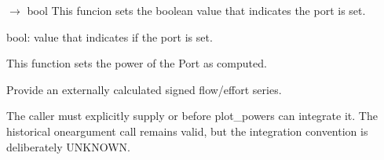 \documentclass[letterpaper,10pt,english]{sphinxmanual}
\begin{document}
\begin{fulllineitems}
\begin{fulllineitems}
\begin{description}
\end{description}

\end{fulllineitems}


\begin{fulllineitems}
\label{\detokenize{scrimp:scrimp.port.Port.set_isSet}}
\pysigstartsignatures
\pysiglinewithargsret
{}
{}
{{ $\rightarrow$ bool}}
\pysigstopsignatures
\sphinxAtStartPar
This funcion sets the boolean value that indicates the port is set.
\begin{description}
\sphinxAtStartPar
bool: value that indicates if the port is set.

\end{description}

\end{fulllineitems}


\begin{fulllineitems}
\label{\detokenize{scrimp:scrimp.port.Port.set_is_computed}}
\pysigstartsignatures
\pysiglinewithargsret
{}
{}
{}
\pysigstopsignatures
\sphinxAtStartPar
This function sets the power of the Port as computed.

\end{fulllineitems}


\begin{fulllineitems}
\label{\detokenize{scrimp:scrimp.port.Port.set_power}}
\pysigstartsignatures
\pysiglinewithargsret
{}
{\sphinxparamcomma {}\sphinxparamcomma {}}
{}
\pysigstopsignatures
\sphinxAtStartPar
Provide an externally calculated signed flow/effort series.

\sphinxAtStartPar
The caller must explicitly supply 
or  before plot\_powers can integrate it.
The historical one\sphinxhyphen{}argument call remains valid, but the
integration convention is deliberately UNKNOWN.

\end{fulllineitems}


\end{fulllineitems}
\end{document}
